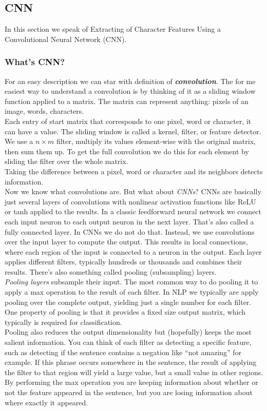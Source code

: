 \documentclass[twocolumn,10pt]{wmrDoc}
\begin{document}
\subsection{CNN}
In this section we speak of Extracting of Character Features Using a Convolutional Neural Network (CNN).
\subsubsection{What's CNN?}
For an easy description we can star with definition of \textit{\textbf{convolution}}.
The for me easiest way to understand a convolution is by thinking of it as a sliding window function applied to a matrix. The matrix can represent anything: pixels of an image, words, characters.\\
 Each entry of start matrix that corresponds to one pixel, word or character, it can have a value. The sliding window is called a kernel, filter, or feature detector. We use a $n×m$ filter, multiply its values element-wise with the original matrix, then sum them up. To get the full convolution we do this for each element by sliding the filter over the whole matrix. \\
Taking the difference between a pixel, word or character and its neighbors detects information.\\
Now we know what convolutions are.
But what about \textit{CNNs}? CNNs are basically just several layers of convolutions with nonlinear activation functions like ReLU or tanh applied to the results. In a classic feedforward neural network we connect each input neuron to each output neuron in the next layer. That's also called a fully connected layer. In CNNs we do not do that. Instead, we use convolutions over the input layer to compute the output. This results in local connections, where each region of the input is connected to a neuron in the output. Each layer applies different filters, typically hundreds or thousands  and combines their results. There's also something called pooling (subsampling) layers.\\
 \textit{Pooling layers} subsample their input. The most common way to do pooling it to apply a max operation to the result of each filter.
 In NLP we typically are apply pooling over the complete output, yielding just a single number for each filter.
 One property of pooling is that it provides a fixed size output matrix, which typically is required for classification.\\
Pooling also reduces the output dimensionality but (hopefully) keeps the most salient information. You can think of each filter as detecting a specific feature, such as detecting if the sentence contains a negation like “not amazing” for example. If this phrase occurs somewhere in the sentence, the result of applying the filter to that region will yield a large value, but a small value in other regions. By performing the max operation you  are keeping information about whether or not the feature appeared in the sentence, but you are losing information about where exactly it appeared.  
\end{document}
